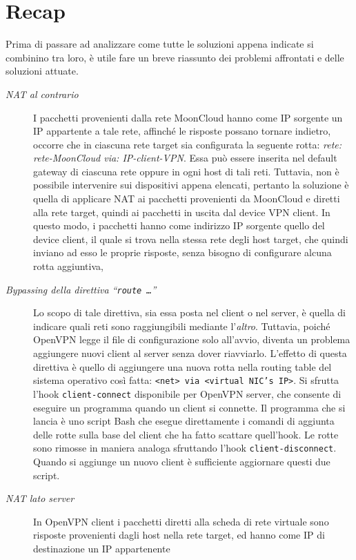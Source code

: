\section{Recap}
Prima di passare ad analizzare come tutte le soluzioni appena indicate si combinino
tra loro, è utile fare un breve riassunto dei problemi affrontati
e delle soluzioni attuate.
\begin{description}
	\item[\textit{NAT al contrario}]I pacchetti provenienti dalla rete MoonCloud
	hanno come IP sorgente un IP appartente a tale rete, affinché le risposte possano
	tornare indietro, occorre che in ciascuna rete target sia configurata la
	seguente rotta: \textit{rete: rete-MoonCloud via: IP-client-VPN}. Essa può
	essere inserita nel default gateway di ciascuna rete oppure in ogni host di tali reti.
	Tuttavia, non è possibile intervenire sui dispositivi appena elencati, pertanto
	la soluzione è quella di applicare NAT ai pacchetti provenienti da MoonCloud e
	diretti alla rete target, quindi ai pacchetti in uscita dal device VPN client.
	In questo modo, i pacchetti hanno come indirizzo IP sorgente quello del device
	client, il quale si trova nella stessa rete degli host target, che quindi inviano
	ad esso le proprie risposte, senza bisogno di configurare alcuna rotta
	aggiuntiva,
	\item[\textit{Bypassing della direttiva ``\texttt{route \ldots}''}]Lo
	scopo di tale direttiva, sia essa posta nel client o nel server, è quella di
	indicare quali reti sono raggiungibili mediante l'\textit{altro}. Tuttavia, poiché
	OpenVPN legge il file di configurazione solo all'avvio, diventa un problema aggiungere
	nuovi client al server senza dover riavviarlo. L'effetto di questa direttiva
	è quello di aggiungere una nuova rotta nella routing table del sistema operativo
	così fatta: \texttt{<net> via <virtual NIC's IP>}. Si sfrutta l'hook \texttt{client-connect}
	disponibile per OpenVPN server, che consente di eseguire un programma quando un client si
	connette. Il programma che si lancia è uno script Bash che esegue direttamente i
	comandi di aggiunta delle rotte sulla base del client che ha fatto scattare quell'hook.
	Le rotte sono rimosse in maniera analoga sfruttando l'hook \texttt{client-disconnect}.
	Quando si aggiunge un nuovo client è sufficiente aggiornare questi due script.
	\item[\textit{NAT lato server}]In OpenVPN
	client i pacchetti diretti alla scheda di rete virtuale sono risposte provenienti
	dagli host nella rete target, ed hanno come IP di destinazione un IP appartenente

\end{description}
